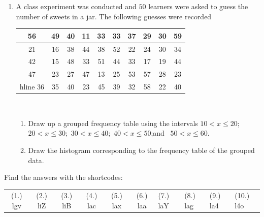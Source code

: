 \begin{exercises}{}{
  \begin{enumerate}[itemsep=5pt, label=\textbf{\arabic*}. ]
 \item  A class experiment was conducted and $50$ learners were asked to
  guess the number of sweets in a jar. The following guesses were
  recorded
\\
  \begin{center}
    \begin{tabular}{|c|c|c|c|c|c|c|c|c|c|} \hline
   
      56 & 49 & 40 & 11 & 33 & 33 & 37 & 29 & 30 & 59 \\ \hline
      21 & 16 & 38 & 44 & 38 & 52 & 22 & 24 & 30 & 34 \\\hline
      42 & 15 & 48 & 33 & 51 & 44 & 33 & 17 & 19 & 44 \\\hline
      47 & 23 & 27 & 47 & 13 & 25 & 53 & 57 & 28 & 23 \\\4hline
      36 & 35 & 40 & 23 & 45 & 39 & 32 & 58 & 22 & 40 \\\hline

    \end{tabular}
  \end{center}
\vspace {8pt}\\
   \begin{enumerate}[noitemsep, label=\textbf{(\alph*)} ]
\item
 Draw up a grouped frequency table using the intervals
  $10 < x \le 20$;\ $20 < x \le 30$;\ $30 < x \le 40$;\ 
  $40 < x \le 50$;and \ $50 < x \le 60$.

  \item Draw the histogram corresponding to the frequency table of the
  grouped data.
\end{enumerate}
\end{enumerate}
\practiceinfo
\par {}Find the answers with the shortcodes:
\par \begin{tabular}[h]{cccccc}
(1.) lgv  &  (2.) liZ  &  (3.) liB  &  (4.) lac  &  (5.) lax  &  (6.) laa  &  (7.) laY  &  (8.) lag  &  (9.) la4  &  (10.) l4o  & \end{tabular}
}
\end{exercises}
